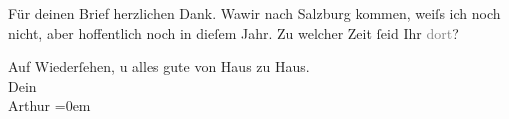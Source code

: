 \pstart
           Für deinen Brief herzlichen Dank. Wa{\geminationn}{\pb}wir nach Salzburg kommen, weiſs ich noch nicht, aber
               hoffentlich noch in dieſem Jahr. Zu welcher Zeit ſeid Ihr
               \textcolor{gray}{dort}?\pend
           
\pstart
           Auf Wiederſehen, u alles gute von Haus zu Haus.{\\[\baselineskip]}Dein{\\[\baselineskip]}\spacefill\mbox{Arthur}\pend
           \leftskip=0em{}\endnumbering{}  
      